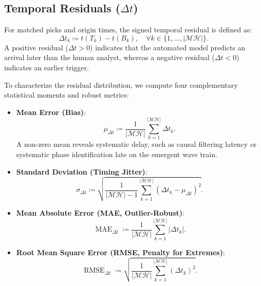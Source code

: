 \subsection{Temporal Residuals (\texorpdfstring{$\Delta t$}{Delta t})}
For matched picks and origin times, the signed temporal residual is defined as:
\begin{equation}
  \Delta t_k \coloneqq t(T_k) - t(B_k), \quad \forall k \in \{1, \dots,
  |\mathcal{MH}|\}.
\end{equation}
A positive residual ($\Delta t > 0$) indicates that the automated
model predicts an arrival later than the human analyst, whereas a
negative residual ($\Delta t < 0$) indicates an earlier trigger.

To characterize the residual distribution, we compute four
complementary statistical moments and robust metrics:
\begin{itemize}
  \item \textbf{Mean Error (Bias)}:
    \begin{equation}
      \mu_{\Delta t} \coloneqq \frac{1}{|\mathcal{MH}|}
      \sum_{k = 1}^{|\mathcal{MH}|} \Delta t_k.
    \end{equation}
    A non-zero mean reveals systematic delay, such as causal
    filtering latency or systematic phase identification late on the
    emergent wave train.
  \item \textbf{Standard Deviation (Timing Jitter)}:
    \begin{equation}
      \sigma_{\Delta t} \coloneqq \sqrt{\frac{1}{|\mathcal{MH}| - 1}
      \sum_{k = 1}^{|\mathcal{MH}|} (\Delta t_k - \mu_{\Delta t})^2}.
    \end{equation}
  \item \textbf{Mean Absolute Error (MAE, Outlier-Robust)}:
    \begin{equation}
      \operatorname{MAE}_{\Delta t} \coloneqq \frac{1}{|\mathcal{MH}|}
      \sum_{k = 1}^{|\mathcal{MH}|} |\Delta t_k|.
    \end{equation}
  \item \textbf{Root Mean Square Error (RMSE, Penalty for Extremes)}:
    \begin{equation}
      \operatorname{RMSE}_{\Delta t} \coloneqq \sqrt{\frac{1}{|\mathcal{MH}|}
      \sum_{k = 1}^{|\mathcal{MH}|} (\Delta t_k)^2}.
    \end{equation}
\end{itemize}

